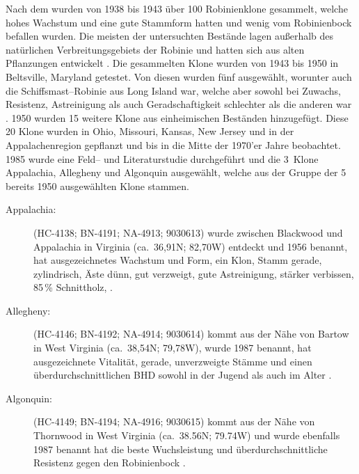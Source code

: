 \documentclass[twocolumn]{scrartcl}
\begin{document}
Nach dem \citet{steinergroup1987robinie} wurden von 1938 bis 1943 über 100
Robinienklone gesammelt, welche hohes Wachstum und eine gute Stammform hatten
und wenig vom Robinienbock befallen wurden. Die meisten der untersuchten
Bestände lagen außerhalb des natürlichen Verbreitungsgebiets der Robinie und
hatten sich aus alten Pflanzungen entwickelt \citep{hopp1941robinie}. Die
gesammelten Klone wurden von 1943 bis 1950 in Beltsville, Maryland getestet. Von
diesen wurden fünf ausgewählt, worunter auch die Schiffsmast--Robinie aus Long
Island war, welche aber sowohl bei Zuwachs, Resistenz, Astreinigung als auch
Geradschaftigkeit schlechter als die anderen war \citep{santamour1960robinie}.
1950 wurden 15 weitere Klone aus einheimischen Beständen hinzugefügt. Diese 20
Klone wurden in Ohio, Missouri, Kansas, New Jersey und in der Appalachenregion
gepflanzt und bis in die Mitte der 1970'er Jahre beobachtet. 1985 wurde eine
Feld-- und Literaturstudie durchgeführt und die 3~Klone Appalachia, Allegheny
und Algonquin ausgewählt, welche aus der Gruppe der 5 bereits 1950 ausgewählten
Klone stammen.

\begin{description}
  \item[Appalachia:] (HC-4138; BN-4191; NA-4913; 9030613) wurde zwischen
Blackwood und Appalachia in Virginia (ca.~36,91N; 82,70W) entdeckt und 1956
benannt, hat ausgezeichnetes Wachstum und Form, ein Klon, Stamm gerade,
zylindrisch, Äste dünn, gut verzweigt, gute Astreinigung, stärker verbissen,
85\,\% Schnittholz, \citep{steinergroup1987robinie,zsombor1980robinie,kapusi1995robinie}.
  \item[Allegheny:]  (HC-4146; BN-4192; NA-4914; 9030614) kommt aus der Nähe von
Bartow in West Virginia (ca.~38,54N; 79,78W), wurde 1987 benannt, hat
ausgezeichnete Vitalität, gerade, unverzweigte Stämme und einen
überdurchschnittlichen BHD sowohl in der Jugend als auch im Alter \citep{steinergroup1987robinie}.
  \item[Algonquin:] (HC-4149; BN-4194; NA-4916; 9030615) kommt aus der Nähe von
Thornwood in West Virginia (ca.~38.56N; 79.74W) und wurde ebenfalls 1987 benannt
hat die beste Wuchsleistung und überdurchschnittliche Resistenz gegen den
Robinienbock \citep{steinergroup1987robinie}.
\end{description}
\end{document}
